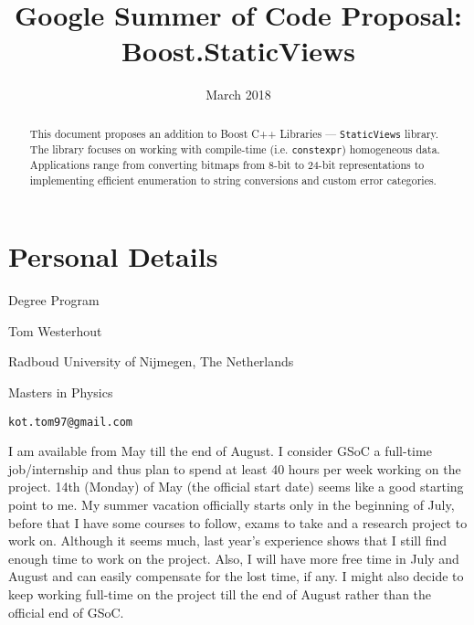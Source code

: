 \documentclass[a4paper,12pt]{article}
\title{Google Summer of Code Proposal: Boost.StaticViews}
\date{March 2018}
\begin{document}
\maketitle

\begin{abstract}
    This document proposes an addition to Boost C++ Libraries ---
    \texttt{StaticViews} library. The library focuses on working with
    compile-time (i.e.  \texttt{constexpr}) homogeneous data. Applications range
    from converting bitmaps from 8-bit to 24-bit representations to implementing
    efficient enumeration to string conversions and custom error categories.
\end{abstract}

\vspace{5cm}
\section*{Personal Details}
    \begin{labeling}{Degree Program}
    \item [Name] Tom Westerhout
    \item [University] Radboud University of Nijmegen, The Netherlands
    \item [Degree Program] Masters in Physics
    \item [Email] \texttt{kot.tom97@gmail.com}
    \item [Availability] I am available from May till the end of August. I
        consider GSoC a full-time job/internship and thus plan to spend at least
        40 hours per week working on the project. 14th (Monday) of May (the
        official start date) seems like a good starting point to me. My summer
        vacation officially starts only in the beginning of July, before that I
        have some courses to follow, exams to take and a research project to
        work on. Although it seems much, last year's experience shows that I
        still find enough time to work on the project. Also, I will have more
        free time in July and August and can easily compensate for the lost
        time, if any. I might also decide to keep working full-time on the
        project till the end of August rather than the official end of GSoC.
    \end{labeling}

\newpage
\end{document}
